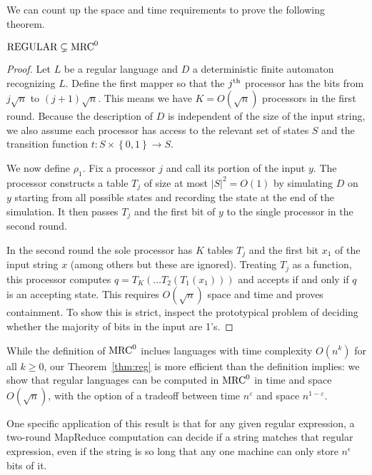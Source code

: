 \documentclass{llncs}
\newcommand{\mrc}{\textup{MRC}}
\begin{document}
We can count up the space and time requirements to prove the following theorem.

\begin{theorem}\label{thm:reg}
   $\textup{REGULAR} \subsetneq \mrc^0$
\end{theorem}

\begin{proof}
Let $L$ be a regular language and $D$ a deterministic finite automaton
recognizing $L$. Define the first mapper so
that the $j^\textup{th}$ processor has the bits from $j\sqrt{n}$ to
$(j+1)\sqrt{n}$. This means we have $K = O(\sqrt{n})$ processors in the first
round. Because the description of $D$ is independent of the size of the input
string, we also assume each processor has access to the relevant set of states
$S$ and the transition function $t: S \times \left \{ 0,1 \right \} \to S$.

We now define $\rho_1$. Fix a processor $j$ and call its portion of the input
$y$. The processor constructs a table $T_j$ of size at most $|S|^2 = O(1)$ by
simulating $D$ on $y$ starting from all possible states and recording the state
at the end of the simulation. It then passes $T_j$ and the first bit of $y$ to
the single processor in the second round.

In the second round the sole processor has $K$ tables $T_j$ and the first bit
$x_1$ of the input string $x$ (among others but these are ignored). Treating
$T_j$ as a function, this processor computes $q = T_K(\dots T_2(T_1(x_1)))$ and
accepts if and only if $q$ is an accepting state. This requires $O(\sqrt{n})$
space and time and proves containment. To show this is strict, inspect the
prototypical problem of deciding whether the majority of bits in the input are
1's.
\end{proof}

\begin{remark} \label{rmk:tradeoff}
While the definition of $\mrc^0$ inclues languages with time complexity
$O(n^k)$ for all $k \geq 0$, our Theorem~\ref{thm:reg} is more efficient than
the definition implies: we show that regular languages can be computed in
$\mrc^0$ in time and space $O(\sqrt{n})$, with the option of a tradeoff between
time $n^\varepsilon$ and space $n^{1-\varepsilon}$.  
\end{remark}

One specific application of this result is that for any given regular
expression, a two-round MapReduce computation can decide if a string matches
that regular expression, even if the string is so long that any one machine can
only store $n^\epsilon$ bits of it.
\end{document}
